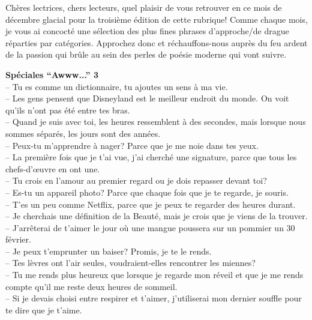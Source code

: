 \documentclass{parch}
\begin{document}
	\begin{multicols}{3}
		\begin{spacing}{.95}
		\noindent Chères lectrices, chers lecteurs, quel plaisir de vous retrouver en ce mois de décembre glacial pour la troisième édition de cette rubrique! Comme chaque mois, je vous ai concocté une sélection des plus fines phrases d’approche/de drague réparties par catégories. Approchez donc et réchauffons-nous auprès du feu ardent de la passion qui brûle au sein des perles de poésie moderne qui vont suivre.
		
		\textbf{Spéciales “Awww...” 3}\\
		-- Tu es comme un dictionnaire, tu ajoutes un sens à ma vie.\\
		-- Les gens pensent que Disneyland est le meilleur endroit du monde. On voit qu’ils n’ont pas été entre tes bras.\\
		-- Quand je suis avec toi, les heures ressemblent à des secondes, mais lorsque nous sommes séparés, les jours sont des années.\\
		-- Peux-tu m’apprendre à nager? Parce que je me noie dans tes yeux.\\
		-- La première fois que je t’ai vue, j’ai cherché une signature, parce que tous les chefs-d’œuvre en ont une.\\
		-- Tu crois en l’amour au premier regard ou je dois repasser devant toi?\\
		-- Es-tu un appareil photo? Parce que chaque fois que je te regarde, je souris.\\
		-- T’es un peu comme Netflix, parce que je peux te regarder des heures durant.\\
		-- Je cherchais une définition de la Beauté, mais je crois que je viens de la trouver.\\
		-- J’arrêterai de t’aimer le jour où une mangue poussera sur un pommier un 30 février.\\
		-- Je peux t’emprunter un baiser? Promis, je te le rends.\\
		-- Tes lèvres ont l’air seules, voudraient-elles rencontrer les miennes?\\
		-- Tu me rends plus heureux que lorsque je regarde mon réveil et que je me rends compte qu’il me reste deux heures de sommeil.\\
		-- Si je devais choisi entre respirer et t’aimer, j’utiliserai mon dernier souffle pour te dire que je t’aime.
		

\end{spacing}
\end{multicols}
\end{document}
